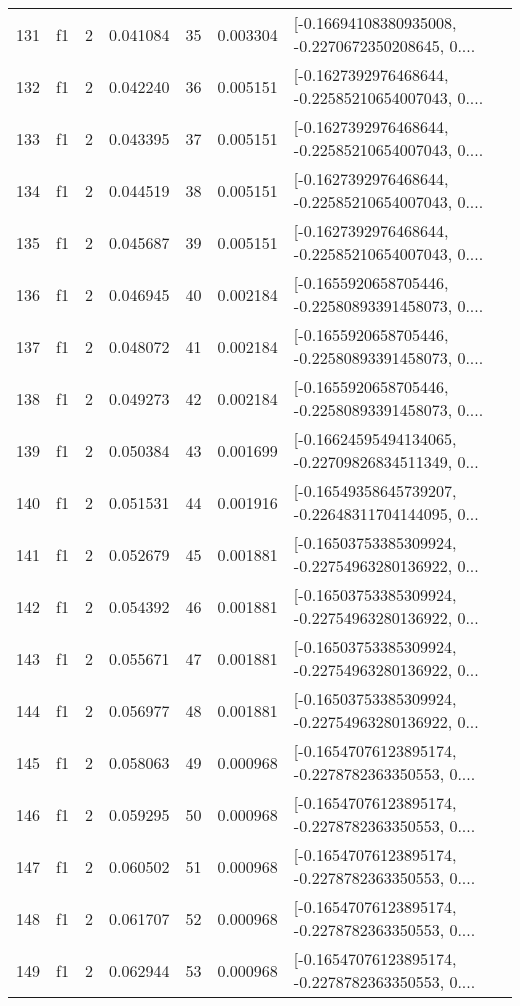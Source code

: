 \begin{tabular}{lllrlrl}
131 &  f1 &   2 &  0.041084 &   35 &  0.003304 &  [-0.16694108380935008, -0.2270672350208645, 0.... \\
132 &  f1 &   2 &  0.042240 &   36 &  0.005151 &  [-0.1627392976468644, -0.22585210654007043, 0.... \\
133 &  f1 &   2 &  0.043395 &   37 &  0.005151 &  [-0.1627392976468644, -0.22585210654007043, 0.... \\
134 &  f1 &   2 &  0.044519 &   38 &  0.005151 &  [-0.1627392976468644, -0.22585210654007043, 0.... \\
135 &  f1 &   2 &  0.045687 &   39 &  0.005151 &  [-0.1627392976468644, -0.22585210654007043, 0.... \\
136 &  f1 &   2 &  0.046945 &   40 &  0.002184 &  [-0.1655920658705446, -0.22580893391458073, 0.... \\
137 &  f1 &   2 &  0.048072 &   41 &  0.002184 &  [-0.1655920658705446, -0.22580893391458073, 0.... \\
138 &  f1 &   2 &  0.049273 &   42 &  0.002184 &  [-0.1655920658705446, -0.22580893391458073, 0.... \\
139 &  f1 &   2 &  0.050384 &   43 &  0.001699 &  [-0.16624595494134065, -0.22709826834511349, 0... \\
140 &  f1 &   2 &  0.051531 &   44 &  0.001916 &  [-0.16549358645739207, -0.22648311704144095, 0... \\
141 &  f1 &   2 &  0.052679 &   45 &  0.001881 &  [-0.16503753385309924, -0.22754963280136922, 0... \\
142 &  f1 &   2 &  0.054392 &   46 &  0.001881 &  [-0.16503753385309924, -0.22754963280136922, 0... \\
143 &  f1 &   2 &  0.055671 &   47 &  0.001881 &  [-0.16503753385309924, -0.22754963280136922, 0... \\
144 &  f1 &   2 &  0.056977 &   48 &  0.001881 &  [-0.16503753385309924, -0.22754963280136922, 0... \\
145 &  f1 &   2 &  0.058063 &   49 &  0.000968 &  [-0.16547076123895174, -0.2278782363350553, 0.... \\
146 &  f1 &   2 &  0.059295 &   50 &  0.000968 &  [-0.16547076123895174, -0.2278782363350553, 0.... \\
147 &  f1 &   2 &  0.060502 &   51 &  0.000968 &  [-0.16547076123895174, -0.2278782363350553, 0.... \\
148 &  f1 &   2 &  0.061707 &   52 &  0.000968 &  [-0.16547076123895174, -0.2278782363350553, 0.... \\
149 &  f1 &   2 &  0.062944 &   53 &  0.000968 &  [-0.16547076123895174, -0.2278782363350553, 0.... \\

\end{tabular}

